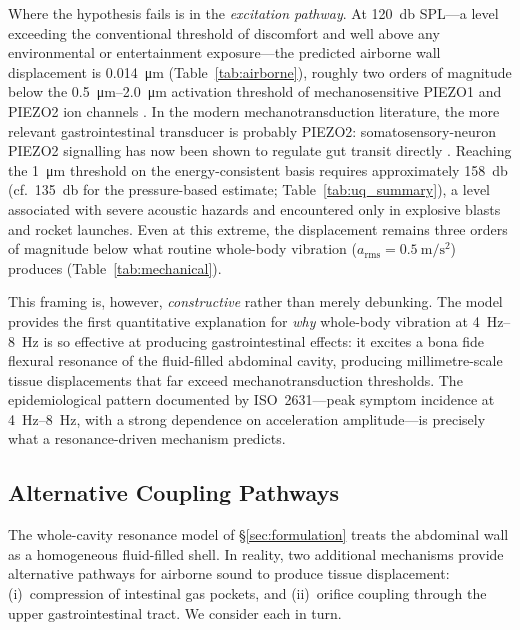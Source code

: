 Where the hypothesis fails is in the \emph{excitation pathway}.  At
\SI{120}{\decibel} SPL---a level exceeding the conventional threshold of
discomfort and well above any
environmental or entertainment exposure---the predicted airborne wall
displacement is \SI{0.014}{\micro\metre} (Table~\ref{tab:airborne}), roughly
two orders of magnitude below the \SIrange{0.5}{2.0}{\micro\metre} activation
threshold of mechanosensitive PIEZO1 and PIEZO2 ion channels
\cite{coste2010piezo1,Lewis2015,Xiao2024}.  In the modern mechanotransduction
literature, the more relevant gastrointestinal transducer is probably PIEZO2:
somatosensory-neuron PIEZO2 signalling has now been shown to regulate gut
transit directly \cite{ServinVences2023}.  Reaching the \SI{1}{\micro\metre} threshold on the energy-consistent basis
requires approximately \SI{158}{\decibel}
(cf.\ \SI{135}{\decibel} for the pressure-based estimate;
Table~\ref{tab:uq_summary}),
a level associated with severe acoustic hazards and encountered only in
explosive blasts and rocket launches.  Even at
this extreme, the displacement remains three
orders of magnitude below what routine whole-body vibration
($a_{\mathrm{rms}} = \SI{0.5}{\metre\per\second\squared}$) produces
(Table~\ref{tab:mechanical}).

This framing is, however, \emph{constructive} rather than merely debunking.
The model provides the first quantitative explanation for \emph{why}
whole-body vibration at \SIrange{4}{8}{\hertz} is so effective at producing
gastrointestinal effects: it excites a bona fide flexural resonance of the
fluid-filled abdominal cavity, producing millimetre-scale tissue
displacements that far exceed mechanotransduction thresholds.  The
epidemiological pattern documented by ISO~2631---peak symptom incidence at
\SIrange{4}{8}{\hertz}, with a strong dependence on acceleration
amplitude---is precisely what a resonance-driven mechanism predicts.

\subsection{Alternative Coupling Pathways}
\label{sec:disc:alternatives}

The whole-cavity resonance model of \S\ref{sec:formulation} treats the
abdominal wall as a homogeneous fluid-filled shell.  In reality, two
additional mechanisms provide alternative pathways for airborne sound to
produce tissue displacement: (i)~compression of intestinal gas pockets, and
(ii)~orifice coupling through the upper gastrointestinal tract.  We consider
each in turn.

